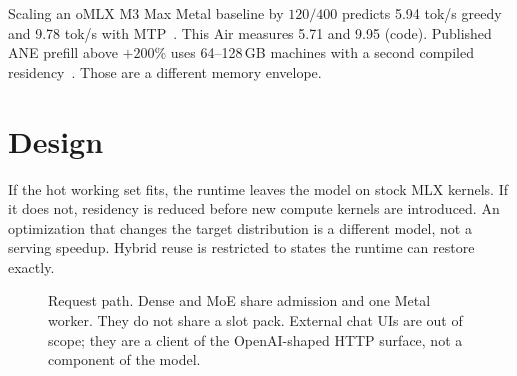 Scaling an oMLX M3 Max Metal baseline by $120/400$ predicts 5.94 tok/s greedy and 9.78 tok/s with MTP~\citep{omlx2874}. This Air measures 5.71 and 9.95 (code). Published ANE prefill above ${+}200\%$ uses 64--128\,GB machines with a second compiled residency~\citep{weschera2026}. Those are a different memory envelope.

\section{\slotbank{} Design}
\label{sec:design}

If the hot working set fits, the runtime leaves the model on stock MLX kernels. If it does not, residency is reduced before new compute kernels are introduced. An optimization that changes the target distribution is a different model, not a serving speedup. Hybrid reuse is restricted to states the runtime can restore exactly.

\begin{figure}[t]
\centering
{}
\caption{Request path. Dense and MoE share admission and one Metal worker. They do not share a slot pack. External chat UIs are out of scope; they are a client of the OpenAI-shaped HTTP surface, not a component of the model.}
\label{fig:arch}
\end{figure}

